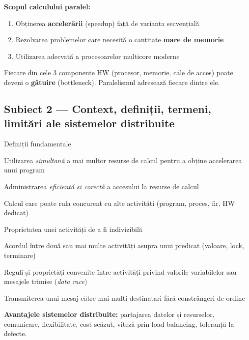 \documentclass[a4paper,11pt]{article}
\newcommand{\subiect}[2]{\subsection{Subiect \textcolor{numcol}{#1} — #2}}
\begin{document}
\textbf{Scopul calculului paralel:}
\begin{enumerate}[noitemsep]
  \item Obținerea \textbf{accelerării} (speedup) față de varianta secvențială
  \item Rezolvarea problemelor care necesită o cantitate \textbf{mare de memorie}
  \item Utilizarea adecvată a procesoarelor multicore moderne
\end{enumerate}

\begin{notebox}
Fiecare din cele 3 componente HW (procesor, memorie, cale de acces) poate deveni o \textbf{gâtuire} (bottleneck). Paralelismul adresează fiecare dintre ele.
\end{notebox}

\subiect{2}{Context, definiții, termeni, limitări ale sistemelor distribuite}

\begin{defbox}{Definiții fundamentale}
\begin{description}[leftmargin=3.5cm, style=nextline, noitemsep]
  \item[\textbf{Paralelism}] Utilizarea \emph{simultană} a mai multor resurse de calcul pentru a obține accelerarea unui program
  \item[\textbf{Concurență}] Administrarea \emph{eficientă și corectă} a accesului la resurse de calcul
  \item[\textbf{Task/Activitate}] Calcul care poate rula concurent cu alte activități (program, proces, fir, HW dedicat)
  \item[\textbf{Atomicitate}] Proprietatea unei activități de a fi indivizibilă
  \item[\textbf{Consensus}] Acordul între două sau mai multe activități asupra unui predicat (valoare, lock, terminare)
  \item[\textbf{Consistență}] Reguli și proprietăți convenite între activități privind valorile variabilelor sau mesajele trimise (\emph{data race})
  \item[\textbf{Multicast}] Transmiterea unui mesaj către mai mulți destinatari fără constrângeri de ordine
\end{description}
\end{defbox}

\textbf{Avantajele sistemelor distribuite:} partajarea datelor și resurselor, comunicare, flexibilitate, cost scăzut, viteză prin load balancing, toleranță la defecte.
\end{document}
